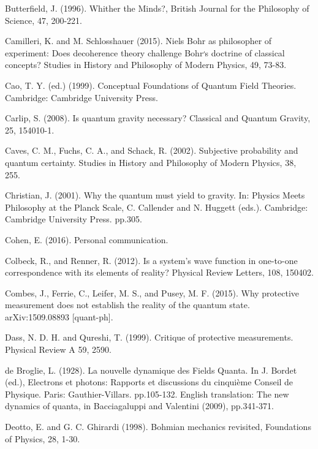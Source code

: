 \begin{thebibliography}{}
\bibitem{} Butterfield, J. (1996). Whither the Minds?, British Journal for the Philosophy of Science, 47, 200-221.

\bibitem{}  Camilleri, K. and M. Schlosshauer (2015). Niels Bohr as philosopher of experiment: Does decoherence theory challenge Bohr׳s doctrine of classical concepts? Studies in History and Philosophy of Modern Physics, 49, 73-83.

\bibitem{} Cao, T. Y. (ed.) (1999). Conceptual Foundations of Quantum Field Theories. Cambridge: Cambridge University Press.

\bibitem{}  Carlip, S. (2008). Is quantum gravity necessary? Classical and Quantum Gravity, 25, 154010-1.


\bibitem{} Caves, C. M., Fuchs, C. A., and Schack, R. (2002). Subjective probability and quantum certainty. Studies in History and Philosophy of Modern Physics, 38, 255.

\bibitem{} Christian,  J. (2001). Why the quantum must yield to gravity. In: Physics Meets Philosophy at the Planck Scale,  C. Callender and N. Huggett (eds.). Cambridge: Cambridge University Press. pp.305.

\bibitem{} Cohen, E. (2016). Personal communication.

\bibitem{} Colbeck, R., and Renner, R. (2012). Is a system's wave function in one-to-one correspondence with its elements of reality? Physical Review Letters, 108, 150402.

\bibitem{} Combes, J., Ferrie, C., Leifer, M. S., and Pusey, M. F. (2015). Why protective measurement does not establish the reality of the quantum state. arXiv:1509.08893 [quant-ph].

\bibitem{} Dass, N. D. H. and Qureshi, T. (1999). Critique of protective measurements. Physical Review A 59, 2590.

\bibitem{} de Broglie, L. (1928). La nouvelle dynamique des Fields Quanta. In J. Bordet (ed.), Electrons et photons: Rapports et discussions du cinquième Conseil de Physique. Paris: Gauthier-Villars. pp.105-132. English translation: The new dynamics of quanta, in Bacciagaluppi and Valentini (2009), pp.341-371.

\bibitem{}  Deotto, E. and G. C. Ghirardi (1998). Bohmian mechanics revisited, Foundations of Physics, 28,  1-30.


\end{thebibliography}
